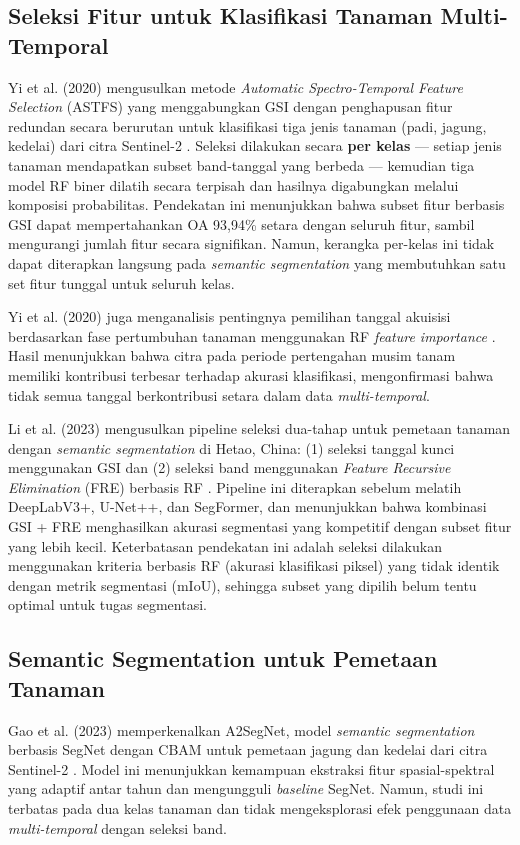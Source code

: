 \subsection{Seleksi Fitur untuk Klasifikasi Tanaman Multi-Temporal}
Yi et al. (2020) mengusulkan metode \textit{Automatic Spectro-Temporal Feature Selection} (ASTFS) yang menggabungkan GSI dengan penghapusan fitur redundan secara berurutan untuk klasifikasi tiga jenis tanaman (padi, jagung, kedelai) dari citra Sentinel-2 \citep{rs12010162}.
Seleksi dilakukan secara \textbf{per kelas} — setiap jenis tanaman mendapatkan subset band-tanggal yang berbeda — kemudian tiga model RF biner dilatih secara terpisah dan hasilnya digabungkan melalui komposisi probabilitas.
Pendekatan ini menunjukkan bahwa subset fitur berbasis GSI dapat mempertahankan OA 93,94\% setara dengan seluruh fitur, sambil mengurangi jumlah fitur secara signifikan.
Namun, kerangka per-kelas ini tidak dapat diterapkan langsung pada \textit{semantic segmentation} yang membutuhkan satu set fitur tunggal untuk seluruh kelas.

Yi et al. (2020) juga menganalisis pentingnya pemilihan tanggal akuisisi berdasarkan fase pertumbuhan tanaman menggunakan RF \textit{feature importance} \citep{yi2020}.
Hasil menunjukkan bahwa citra pada periode pertengahan musim tanam memiliki kontribusi terbesar terhadap akurasi klasifikasi, mengonfirmasi bahwa tidak semua tanggal berkontribusi setara dalam data \textit{multi-temporal}.

Li et al. (2023) mengusulkan pipeline seleksi dua-tahap untuk pemetaan tanaman dengan \textit{semantic segmentation} di Hetao, China: (1) seleksi tanggal kunci menggunakan GSI dan (2) seleksi band menggunakan \textit{Feature Recursive Elimination} (FRE) berbasis RF \citep{li2023hetao}.
Pipeline ini diterapkan sebelum melatih DeepLabV3+, U-Net++, dan SegFormer, dan menunjukkan bahwa kombinasi GSI + FRE menghasilkan akurasi segmentasi yang kompetitif dengan subset fitur yang lebih kecil.
Keterbatasan pendekatan ini adalah seleksi dilakukan menggunakan kriteria berbasis RF (akurasi klasifikasi piksel) yang tidak identik dengan metrik segmentasi (mIoU), sehingga subset yang dipilih belum tentu optimal untuk tugas segmentasi.

\subsection{Semantic Segmentation untuk Pemetaan Tanaman}
Gao et al. (2023) memperkenalkan A2SegNet, model \textit{semantic segmentation} berbasis SegNet dengan CBAM untuk pemetaan jagung dan kedelai dari citra Sentinel-2 \citep{gao2023}.
Model ini menunjukkan kemampuan ekstraksi fitur spasial-spektral yang adaptif antar tahun dan mengungguli \textit{baseline} SegNet.
Namun, studi ini terbatas pada dua kelas tanaman dan tidak mengeksplorasi efek penggunaan data \textit{multi-temporal} dengan seleksi band.

